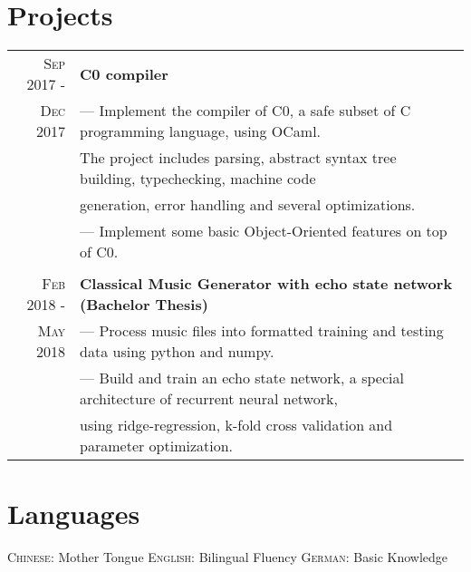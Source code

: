 \documentclass[a4paper,10pt]{article}
\begin{document}
	\section{Projects}
	\begin{tabular}{r | l}
	    \textsc{Sep 2017 - } & \textbf{C0 compiler} 
	    \\\textsc{Dec 2017}& --- Implement the compiler of C0, a safe subset of C programming language, using OCaml.\\&The project includes parsing, abstract syntax tree building, typechecking, machine code\\& generation, error handling and several optimizations.
	    \\& --- Implement some basic Object-Oriented features on top of C0.
		\\ \multicolumn{1}{c}{} \\
	    \textsc{Feb 2018 - } & \textbf{Classical Music Generator with echo state network (Bachelor Thesis)} \\\textsc{May 2018}& --- Process music files into formatted training and testing data using python and numpy.
	    \\& --- Build and train an echo state network, a special architecture of recurrent neural network,\\&using ridge-regression, k-fold cross validation and parameter optimization. 

	\end{tabular}
	
	\section{Languages}
		\textsc{Chinese:} Mother Tongue \quad \quad
		\textsc{English:} Bilingual Fluency \quad \quad
		\textsc{German:} Basic Knowledge \quad \quad
	
\end{document}
